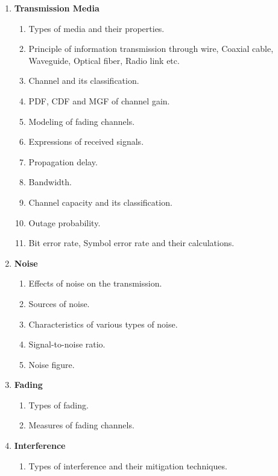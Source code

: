 \documentclass[12pt, a4paper]{article}
\newcommand{\hl}[1]{\colorbox{lgreen}{#1}}
\begin{document}
\begin{enumerate}
		\item \textbf{Transmission Media}
		\begin{enumerate}[label*=\arabic*.]
			\item Types of media and their properties.
			\item \hl{Principle of information transmission through wire, Coaxial cable,} Waveguide, Optical fiber, \hl{Radio link etc.}
			\item \hl{Channel and its classification.}
			\item \hl{PDF, CDF and MGF of channel gain.}
			\item \hl{Modeling of fading channels.}
			\item \hl{Expressions of received signals.}
			\item Propagation delay.
			\item \hl{Bandwidth.}
			\item \hl{Channel capacity and its classification.}
			\item \hl{Outage probability.}
			\item \hl{Bit error rate, Symbol error rate and their calculations.}
		\end{enumerate}
		
		\item \textbf{Noise}
		\begin{enumerate}[label*=\arabic*.]
			\item \hl{Effects of noise on the transmission.}
			\item \hl{Sources of noise.}
			\item \hl{Characteristics of various types of noise.}
			\item \hl{Signal-to-noise ratio.}
			\item \hl{Noise figure.}
		\end{enumerate}
		
		\item \textbf{Fading}
		\begin{enumerate}[label*=\arabic*.]
			\item \hl{Types of fading.}
			\item \hl{Measures of fading channels.}
		\end{enumerate}
		
		\item \textbf{Interference}
		\begin{enumerate}[label*=\arabic*.]
			\item \hl{Types of interference and their mitigation techniques.}
		\end{enumerate}
		

\end{enumerate}
\end{document}

